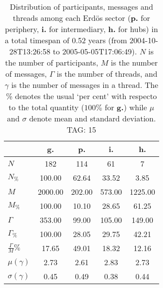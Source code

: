 \begin{table}[h!]
\begin{center}
\begin{tabular}{| l | c | c | c | c |}\hline
 & g. & p. & i. & h. \\\hline
$N$ & 182  & 114  & 61  & 7 \\\hline
$N_{\%}$ & 100.00  & 62.64  & 33.52  & 3.85 \\\hline
$M$ & 2000.00  & 202.00  & 573.00  & 1225.00 \\\hline
$M_{\%}$ & 100.00  & 10.10  & 28.65  & 61.25 \\\hline
$\Gamma$ & 353.00  & 99.00  & 105.00  & 149.00 \\\hline
$\Gamma_{\%}$ & 100.00  & 28.05  & 29.75  & 42.21 \\\hline
$\frac{\Gamma}{M}\%$ & 17.65  & 49.01  & 18.32  & 12.16 \\\hline
$\mu(\gamma)$ & 2.73  & 2.61  & 2.83  & 2.73 \\\hline
$\sigma(\gamma)$ & 0.45  & 0.49  & 0.38  & 0.44 \\\hline
\end{tabular}
\caption{Distribution of participants, messages and threads among each Erd\"os sector ({\bf p.} for periphery, {\bf i.} for intermediary, 
    {\bf h.} for hubs) in a total timespan of 0.52 years (from 2004-10-28T13:26:58 to 2005-05-05T17:06:49). $N$ is the number of participants, $M$ is the number of messages, $\Gamma$ is the number of threads, and $\gamma$ is the number of messages in a thread.
    The \% denotes the usual `per cent' with respecto to the total quantity ($100\%$ for {\bf g.})
    while $\mu$ and $\sigma$ denote mean and standard deviation. TAG: 15}
\end{center}
\end{table}